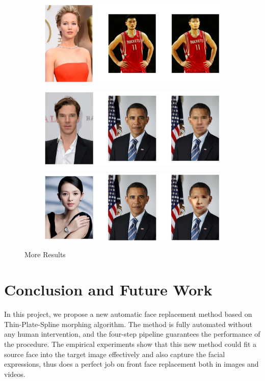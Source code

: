 \documentclass[10pt,twocolumn,letterpaper]{article}
\begin{document}
\begin{figure}
\centering
   \begin{subfigure}[b]{0.4\textwidth}
   \includegraphics[width=1\linewidth]{7_8.eps}
   \label{fig:eg4}
\end{subfigure}

\begin{subfigure}[b]{0.4\textwidth}
   \includegraphics[width=1\linewidth]{4_5.eps}
   \label{fig:eg5}
\end{subfigure}
\begin{subfigure}[b]{0.4\textwidth}
   \includegraphics[width=1\linewidth]{3_5.eps}
   \label{fig:eg6}
\end{subfigure}
\caption{More Results}\label{more_result}
\end{figure}

\section{Conclusion and Future Work}
\label{sec:conclusion}
In this project, we propose a new automatic face replacement method based on Thin-Plate-Spline morphing algorithm. The method is fully automated without any human intervention, and the four-step pipeline guarantees the performance of the procedure. The empirical experiments show that this new method could fit a source face into the target image effectively and also capture the facial expressions, thus does a perfect job on front face replacement both in images and videos.
\end{document}
